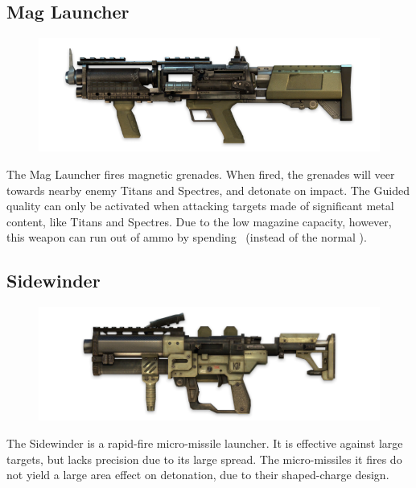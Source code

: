 \documentclass[9pt, openany]{extbook}
\begin{document}
\subsection{Mag Launcher}
\begin{figure}
\vspace*{-2em}
\includegraphics[width=\linewidth]{MagLauncher}
\end{figure}


The Mag Launcher fires magnetic grenades. When fired, the grenades will veer towards nearby enemy Titans and Spectres, and detonate on impact. The Guided quality can only be activated when attacking targets made of significant metal content, like Titans and Spectres. Due to the low magazine capacity, however, this weapon can run out of ammo by spending \Threat\Threat\Threat\ (instead of the normal \Despair).

\subsection{Sidewinder}
\begin{figure}
\vspace*{-2em}
\includegraphics[width=\linewidth]{Sidewinder}
\end{figure}

The Sidewinder is a rapid-fire micro-missile launcher. It is effective against large targets, but lacks precision due to its large spread. The micro-missiles it fires do not yield a large area effect on detonation, due to their shaped-charge design.
\end{document}
